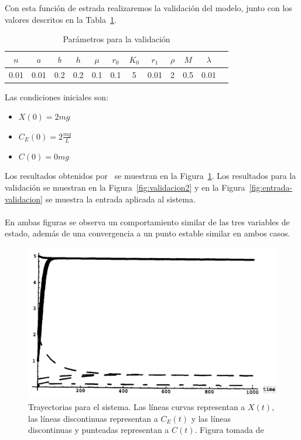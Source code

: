 Con esta función de estrada realizaremos la validación del modelo, junto con los valores descritos en la Tabla~\ref{tab:validacion}.

\begin{table}[ht!]
\caption{Parámetros para la validación}
\label{tab:validacion}
\centering
\begin{tabular}{|c|c|c|c|c|c|c|c|c|c|c|c|}
\hline
$n$ & $a$ & $b$ & $h$ & $\mu$ & $r_0$ & $K_0$ & $r_1$ & $\rho$ & $M$ & $\lambda$ \\\hline
0.01 & 0.01 & 0.2 & 0.2 & 0.1 & 0.1 & 5 & 0.01 & 2 & 0.5 & 0.01 \\\hline
\end{tabular}
\end{table}

Las condiciones iniciales son:
\begin{itemize}
\item $X(0) = 2mg$
\item $C_E(0) = 2\frac{mg}{L}$
\item $C(0) = 0mg$
\end{itemize}

Los resultados obtenidos por~\cite{1} se muestran en la Figura~\ref{fig:validacion1}. Los resultados para la validación se muestran en la Figura~\ref{fig:validacion2} y en la Figura~\ref{fig:entrada-validacion} se muestra la entrada aplicada al sistema.\\ \ \\
En ambas figuras se observa un comportamiento similar de las tres variables de estado, además de una convergencia a un punto estable similar en ambos casos.

\begin{figure}[ht!]
\centering
\includegraphics[scale = 0.3]{validacion1}
\caption{Trayectorias para el sistema. Las líneas curvas representan a $X(t)$, las líneas discontinuas representan a $C_E(t)$ y las líneas discontinuas y punteadas representan a $C(t)$. Figura tomada de \cite{1}}
\label{fig:validacion1}
\end{figure}

